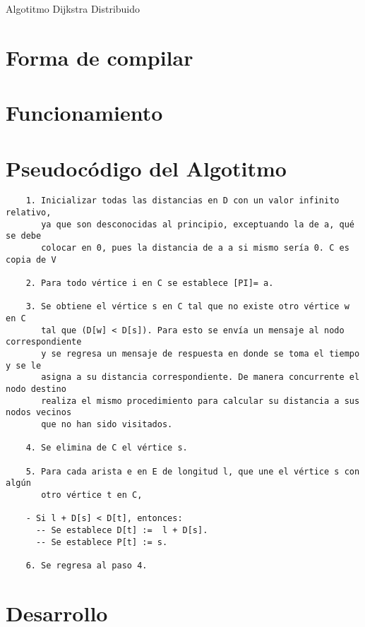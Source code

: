 \documentclass[a4paper,12pt]{article}
\begin{document}

\newpage



\newpage

\begin{center}
    {\Large Algotitmo Dijkstra Distribuido}
\end{center}

\section*{Forma de compilar}

\section*{Funcionamiento}

\section*{Pseudocódigo del Algotitmo}
\begin{verbatim}
    1. Inicializar todas las distancias en D con un valor infinito relativo, 
       ya que son desconocidas al principio, exceptuando la de a, qué se debe 
       colocar en 0, pues la distancia de a a si mismo sería 0. C es copia de V
    
    2. Para todo vértice i en C se establece [PI]= a.
    
    3. Se obtiene el vértice s en C tal que no existe otro vértice w en C 
       tal que (D[w] < D[s]). Para esto se envía un mensaje al nodo correspondiente 
       y se regresa un mensaje de respuesta en donde se toma el tiempo y se le 
       asigna a su distancia correspondiente. De manera concurrente el nodo destino 
       realiza el mismo procedimiento para calcular su distancia a sus nodos vecinos
       que no han sido visitados.
    
    4. Se elimina de C el vértice s.
    
    5. Para cada arista e en E de longitud l, que une el vértice s con algún 
       otro vértice t en C,
    
    - Si l + D[s] < D[t], entonces:
      -- Se establece D[t] :=  l + D[s].
      -- Se establece P[t] := s.
      
    6. Se regresa al paso 4.
\end{verbatim}
    

\section*{Desarrollo}
\end{document}
